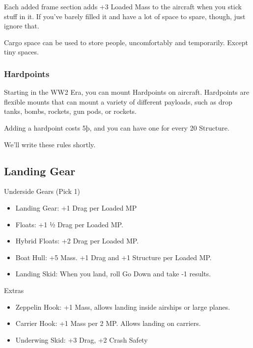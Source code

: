 \documentclass{article}
\begin{document}
Each added frame section adds +3 Loaded Mass to the aircraft when you
stick stuff in it. If you've barely filled it and have a lot of space to
spare, though, just ignore that.

Cargo space can be used to store people, uncomfortably and temporarily.
Except tiny spaces.

\subsubsection{Hardpoints}
\label{_Hardpoints}

Starting in the WW2 Era, you can mount Hardpoints on aircraft.
Hardpoints are flexible mounts that can mount a variety of different
payloads, such as drop tanks, bombs, rockets, gun pods, or rockets.

Adding a hardpoint costs 5þ, and you can have one for every 20
Structure.

We'll write these rules shortly.

\subsection{Landing Gear}
\label{_Landing_Gear}

Underside Gears (Pick 1)

\begin{itemize}
    \item          Landing Gear: +1 Drag per Loaded MP
    \item          Floats: +1 ½ Drag per Loaded MP.
    \item          Hybrid Floats: +2 Drag per Loaded MP.
    \item          Boat Hull: +5 Mass. +1 Drag and +1 Structure per Loaded MP.
    \item          Landing Skid: When you land, roll Go Down and take -1 results.
\end{itemize}

Extras

\begin{itemize}
    \item          Zeppelin Hook: +1 Mass, allows landing inside airships or large
          planes.
\end{itemize}

\begin{itemize}
    \item          Carrier Hook: +1 Mass per 2 MP. Allows landing on carriers.
    \item          Underwing Skid: +3 Drag, +2 Crash Safety
\end{itemize}
\end{document}
